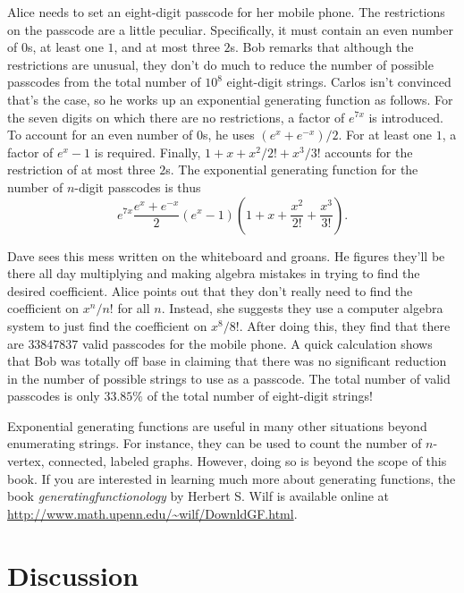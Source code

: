 \begin{example}
  Alice needs to set an eight-digit passcode for her mobile phone. The
  restrictions on the passcode are a little peculiar. Specifically, it
  must contain an even number of $0$s, at least one $1$, and at most
  three $2$s. Bob remarks that although the restrictions are unusual,
  they don't do much to reduce the number of possible passcodes from
  the total number of $10^8$ eight-digit strings. Carlos isn't
  convinced that's the case, so he works up an exponential generating
  function as follows. For the seven digits on which there are no
  restrictions, a factor of $e^{7x}$ is introduced. To account for an
  even number of $0$s, he uses $(e^x+e^{-x})/2$. For at least one
  $1$, a factor of $e^x-1$ is required. Finally, $1+x+x^2/2!+x^3/3!$
  accounts for the restriction of at most three $2$s. The exponential
  generating function for the number of $n$-digit passcodes is thus
  \[e^{7x}\frac{e^x+e^{-x}}{2}(e^x-1)\left(1+x+\frac{x^2}{2!} +
    \frac{x^3}{3!}\right).\]
  
  Dave sees this mess written on the whiteboard and groans. He figures
  they'll be there all day multiplying and making algebra mistakes in
  trying to find the desired coefficient. Alice points out that they
  don't really need to find the coefficient on $x^n/n!$ for all
  $n$. Instead, she suggests they use a computer algebra system to
  just find the coefficient on $x^8/8!$. After doing this, they find
  that there are $33847837$ valid passcodes for the mobile phone. A
  quick calculation shows that Bob was totally off base in claiming
  that there was no significant reduction in the number of possible
  strings to use as a passcode. The total number of valid passcodes is
  only $33.85\%$ of the total number of eight-digit strings!
\end{example}

Exponential generating functions are useful in many other situations
beyond enumerating strings. For instance, they can be used to count
the number of $n$-vertex, connected, labeled graphs. However, doing so
is beyond the scope of this book. If you are interested in learning
much more about generating functions, the book
\emph{generatingfunctionology} by Herbert S. Wilf is available online
at \url{http://www.math.upenn.edu/~wilf/DownldGF.html}.

\section{Discussion}\label{s:genfunction:discussion}

